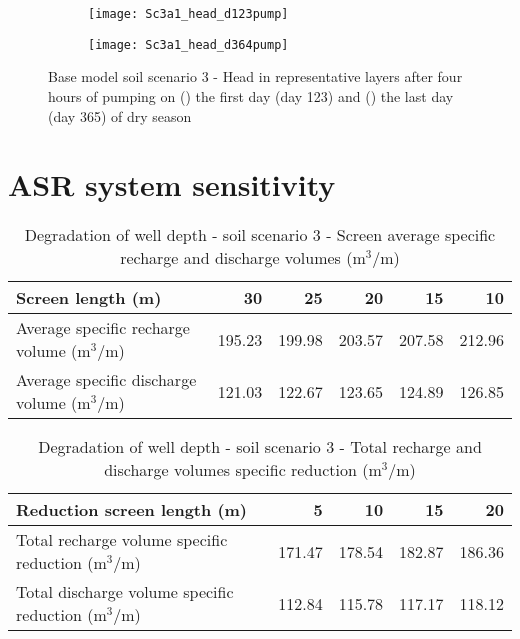 \begin{figure}[h!]
	\centering
	\begin{subfigure}[b]{0.5\linewidth}
		\centering\texttt{[image: Sc3a1\_head\_d123pump]}
		\captionsetup{justification=centering}		
		\caption{\label{fig:Sc3a1_head_d123pump}}
		\end{subfigure}\hfill
	\begin{subfigure}[b]{0.5\linewidth}
        \centering\texttt{[image: Sc3a1\_head\_d364pump]}
		\captionsetup{justification=centering}		
		\caption{\label{fig:Sc3a1_head_d364pump}}
		\end{subfigure}
		\captionsetup{justification=centering}	
	\caption{Base model soil scenario 3 - Head in representative layers after four hours of pumping on () the first day (day 123) and () the last day (day 365) of dry season} 
	\label{fig:Example_Sc3_base_head_dry}
\end{figure} 

\section{ASR system sensitivity}
\label{section:addition_sens}


\begin{table}[h!]
\small
\centering
\caption{Degradation of well depth - soil scenario 3 - Screen average specific recharge and discharge volumes (m$^3$/m)}
\label{tab:sc3_up_clean_rev_specific_volume}
\begin{tabular}{l|r|r|r|r|r}
\hline 
\textbf{Screen length (m)}                   & \textbf{30}      & \textbf{25}      & \textbf{20}      & \textbf{15}      & \textbf{10}       \\ \hline \hline
Average specific recharge volume (m$^3$/m)   & 195.23  & 199.98  & 203.57  & 207.58  & 212.96   \\ \hline 
Average specific discharge volume (m$^3$/m)  & 121.03  & 122.67  & 123.65  & 124.89  & 126.85   \\ \hline     
\end{tabular}
\end{table}

\begin{table}[h!]
\small
\centering
\caption{Degradation of well depth - soil scenario 3 - Total recharge and discharge volumes specific reduction (m$^3$/m)}
\label{tab:sc3_up_clean_rev_specific_volume_reduction}
\begin{tabular}{l|r|r|r|r}
\hline 
\textbf{Reduction screen length (m)}                 & \textbf{5}      & \textbf{10}      & \textbf{15}      & \textbf{20}       \\ \hline \hline
Total recharge volume specific reduction (m$^3$/m)   & 171.47  & 178.54  & 182.87  & 186.36    \\ \hline 
Total discharge volume specific reduction (m$^3$/m)  & 112.84  & 115.78  & 117.17  & 118.12    \\ \hline     
\end{tabular}
\end{table}


